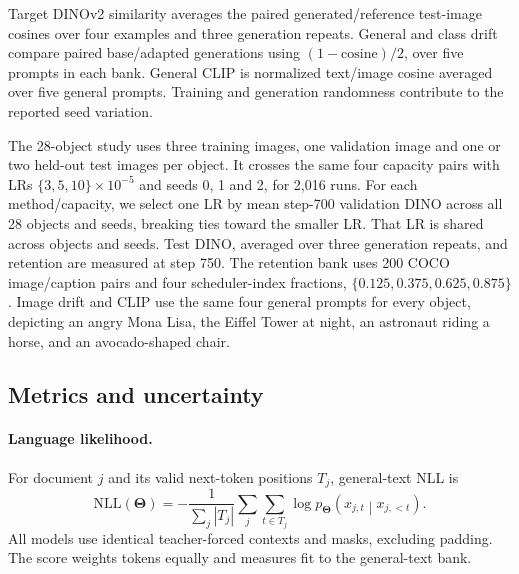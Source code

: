 Target DINOv2 similarity averages the paired generated/reference test-image cosines over four examples and three generation repeats. General and class drift compare paired base/adapted generations using $(1-\mathrm{cosine})/2$, over five prompts in each bank. General CLIP is normalized text/image cosine averaged over five general prompts. Training and generation randomness contribute to the reported seed variation.

The 28-object study uses three training images, one validation image and one or two held-out test images per object. It crosses the same four capacity pairs with LRs $\{3,5,10\}\times10^{-5}$ and seeds 0, 1 and 2, for 2,016 runs. For each method/capacity, we select one LR by mean step-700 validation DINO across all 28 objects and seeds, breaking ties toward the smaller LR. That LR is shared across objects and seeds. Test DINO, averaged over three generation repeats, and retention are measured at step 750. The retention bank uses 200 COCO image/caption pairs and four scheduler-index fractions, $\{0.125,0.375,0.625,0.875\}$. Image drift and CLIP use the same four general prompts for every object, depicting an angry Mona Lisa, the Eiffel Tower at night, an astronaut riding a horse, and an avocado-shaped chair.

\subsection{Metrics and uncertainty}
\paragraph{Language likelihood.}
For document $j$ and its valid next-token positions $T_j$, general-text NLL is
\begin{equation*}
 \mathrm{NLL}(\bm\Theta)=-\frac{1}{\sum_j |T_j|}\sum_j\sum_{t\in T_j}
 \log p_{\bm\Theta}\!\left(x_{j,t}\middle|x_{j,<t}\right).
\end{equation*}
All models use identical teacher-forced contexts and masks, excluding padding. The score weights tokens equally and measures fit to the general-text bank.

